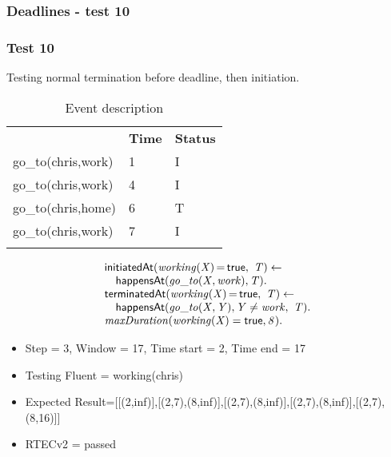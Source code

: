 \documentclass[8pt]{beamer}
\DeclareMathOperator{\val}{=}  %
\def \patsize {}
\def\happensAt{\textsf{\patsize happensAt}}
\def\initiatedAt{\textsf{\patsize initiatedAt}}
\def\terminatedAt{\textsf{\patsize terminatedAt}}
\def\true{\textsf{\patsize true}}
\newenvironment{mysplit}%
  {\arraycolsep 0pt \begin{array}{l}}%
  {\end{array}}
\begin{document}
\begin{frame}
    \frametitle{Deadlines - test 10}
    \subsubsection{Test 10}
    \small
    Testing normal termination before deadline, then initiation.\linebreak
    \begin{minipage}{0.48\linewidth}
        \begin{table}[t!]
            \caption{Event description}
            \begin{center}

                \begin{tabular}{lll}
                    \hline\noalign{\smallskip}
                    \multicolumn{1}{l}{\textbf{Event}} & \multicolumn{1}{c}{\textbf{Time}} & \multicolumn{1}{c}{\textbf{Status}} \\
                    go\_to(chris,work)& 1 & I\\
                    go\_to(chris,work)& 4 & I\\
                    go\_to(chris,home)& 6 & T\\
                    go\_to(chris,work)& 7 & I\\
                    \noalign{\smallskip}
                    \hline
                \end{tabular}
            \end{center}
        \end{table}
    \end{minipage}
    \begin{minipage}{0.48\linewidth}
        \begin{align*}
            \begin{mysplit}
                \initiatedAt\mathit{(working(X)\val\true,\ T)\leftarrow}\\
                \quad    \happensAt\mathit{(go\_to(X,work),T)}.\\
                \terminatedAt\mathit{(working(X)\val\true,\ T) \leftarrow}\\
                \quad    \happensAt\mathit{(go\_to(X,Y),Y\neq work,\ T)}.\\
                \mathit{maxDuration(working(X)=\true,8)}.\\
            \end{mysplit}
        \end{align*}
    \end{minipage}
    \begin{itemize}
        \item  Step = 3, Window = 17, Time start = 2, Time end = 17
        \item Testing Fluent = working(chris)
        \item Expected Result=[[(2,inf)],[(2,7),(8,inf)],[(2,7),(8,inf)],[(2,7),(8,inf)],[(2,7),(8,16)]]
        \item RTECv2 = passed
    \end{itemize}
\end{frame}
\end{document}
